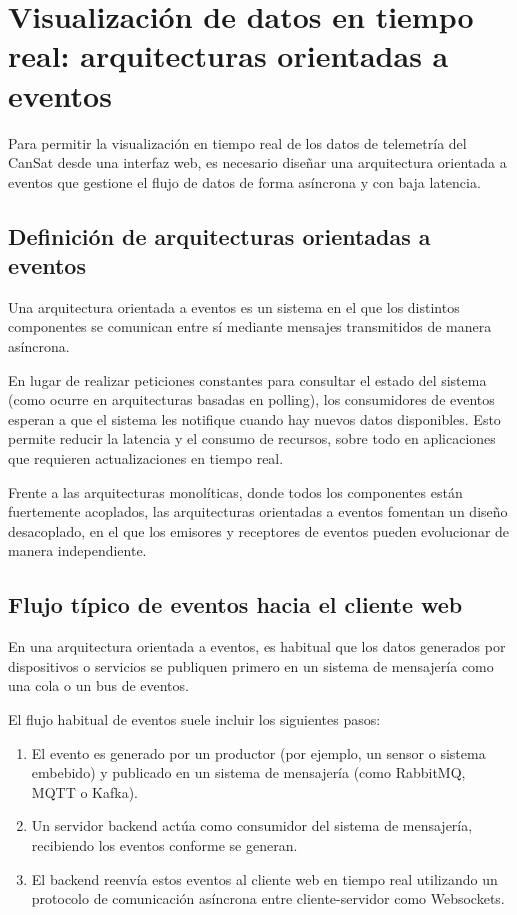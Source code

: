 \section{Visualización de datos en tiempo real: arquitecturas orientadas a eventos}

Para permitir la visualización en tiempo real de los datos de telemetría del CanSat desde una interfaz web, es necesario diseñar una arquitectura orientada a eventos que gestione el flujo de datos de forma asíncrona y con baja latencia.

\subsection{Definición de arquitecturas orientadas a eventos}

Una arquitectura orientada a eventos es un sistema en el que los distintos componentes se comunican entre sí mediante mensajes transmitidos de manera asíncrona.


En lugar de realizar peticiones constantes para consultar el estado del sistema (como ocurre en arquitecturas basadas en polling), los consumidores de eventos esperan a que el sistema les notifique cuando hay nuevos datos disponibles.
Esto permite reducir la latencia y el consumo de recursos, sobre todo en aplicaciones que requieren actualizaciones en tiempo real.

Frente a las arquitecturas monolíticas, donde todos los componentes están fuertemente acoplados, las arquitecturas orientadas a eventos fomentan un diseño desacoplado, en el que los emisores y receptores de eventos pueden evolucionar de manera independiente.

\subsection{Flujo típico de eventos hacia el cliente web}

En una arquitectura orientada a eventos, es habitual que los datos generados por dispositivos o servicios se publiquen primero en un sistema de mensajería como una cola o un bus de eventos.

El flujo habitual de eventos suele incluir los siguientes pasos:

\begin{enumerate}
    \item El evento es generado por un productor (por ejemplo, un sensor o sistema embebido) y publicado en un sistema de mensajería (como RabbitMQ, MQTT o Kafka).

    \item Un servidor backend actúa como consumidor del sistema de mensajería, recibiendo los eventos conforme se generan.

    \item El backend reenvía estos eventos al cliente web en tiempo real utilizando un protocolo de comunicación asíncrona entre cliente-servidor como Websockets.
\end{enumerate}

